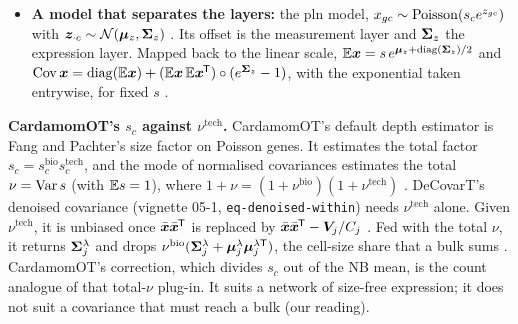\documentclass[11pt,a4paper]{article}
\begin{document}
\begin{itemize}
        counts . The article reaches the same conclusion in its appendix on the within-type
        covariance that enters the bulk.
  \item \textbf{A model that separates the layers:} the \gls{pln} model, $x_{gc}\sim\operatorname{Poisson}(s_c
        e^{z_{gc}})$ with $\bm z_{\cdot c}\sim\mathcal N(\bm{\mu}_z,\bm{\Sigma}_z)$
        \parencite{chiquetPoissonLognormalModelVersatile2021}. Its offset is the measurement layer and
        $\bm{\Sigma}_z$ the expression layer. Mapped back to the linear scale,
        $\mathbb{E}\bm x=s\,e^{\bm{\mu}_z+\operatorname{diag}(\bm{\Sigma}_z)/2}$ and $\operatorname{Cov}\bm x=\operatorname{diag}(\mathbb{E}\bm x)+(\mathbb{E}\bm x\,\mathbb{E}\bm x^{\mkern-1.5mu\mathsf{T}})\circ
        (e^{\bm{\Sigma}_z}-1)$, with the exponential taken entrywise, for fixed $s$ .
\end{itemize}

\textbf{CardamomOT's $s_c$ against $\nu^{\mathrm{tech}}$.} CardamomOT's default depth estimator is Fang and
Pachter's size factor on Poisson genes. It estimates the total factor $s_c=s^{\mathrm{bio}}_cs^{\mathrm{tech}}_c$,
and the mode of normalised covariances estimates the total $\nu=\operatorname{Var} s$ (with $\mathbb{E} s=1$), where
$1+\nu=(1+\nu^{\mathrm{bio}})(1+\nu^{\mathrm{tech}})$ . DeCovarT's denoised covariance (vignette 05-1,
\texttt{eq-denoised-within}) needs $\nu^{\mathrm{tech}}$ alone. Given $\nu^{\mathrm{tech}}$, it is unbiased once
$\bar{\bm x}\bar{\bm x}^{\mkern-1.5mu\mathsf{T}}$ is replaced by $\bar{\bm x}\bar{\bm x}^{\mkern-1.5mu\mathsf{T}}-\bm V_j/C_j$ . Fed with the
total $\nu$, it returns $\bm{\Sigma}^{\lambda}_j$ and drops
$\nu^{\mathrm{bio}}(\bm{\Sigma}^{\lambda}_j+\bm{\mu}^{\lambda}_j\bm{\mu}^{\lambda\mathsf T}_j)$, the cell-size share that a bulk sums
. CardamomOT's correction, which divides $s_c$ out of the NB mean, is the count analogue of that
total-$\nu$ plug-in. It suits a network of size-free expression; it does not suit a covariance that must reach
a bulk (our reading).
\end{document}
